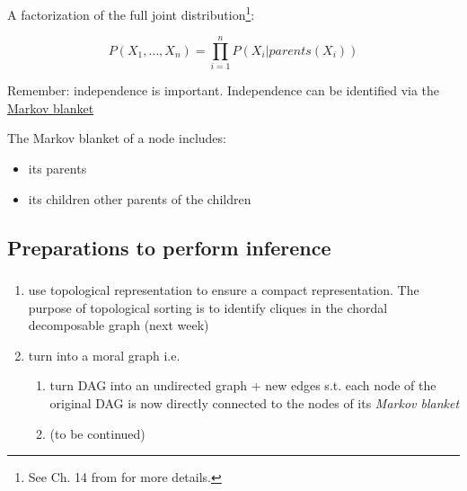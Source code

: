\begin{frame}\frametitle{\secname}
    
A factorization of the full joint distribution\footnote{See Ch. 14 from \citep{russell2016artificial} for more details.}:

\begin{equation}
P(X_{1},\ldots,X_{n}) = \prod_{i=1}^{n} P(X_{i} | parents(X_{i}))
\end{equation}
    
Remember: independence is important. Independence can be identified via the 
\underline{Markov blanket}

The Markov blanket of a node includes:
\begin{itemize}
\item its parents
\item its children
other parents of the children    
\end{itemize}
    
\end{frame}

\subsection{Preparations to perform inference}

\begin{frame}\frametitle{\subsecname}
    
    \begin{enumerate}
     \item use topological representation to ensure a compact representation.
     The purpose of topological sorting is to identify cliques in the chordal decomposable graph (next week)
     \item turn into a moral graph i.e.
     \begin{enumerate}
     \item turn DAG into an undirected graph + new edges s.t. each node of the original DAG is now directly connected to the nodes of its \emph{Markov blanket}
     \item (to be continued)
     \end{enumerate}   
    \end{enumerate}
    
\end{frame}


